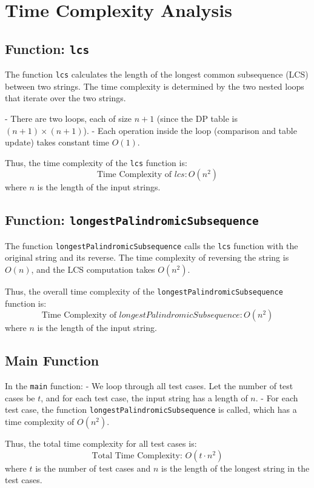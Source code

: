 \documentclass[a4paper,12pt]{report}
\begin{document}
\section*{Time Complexity Analysis}

\subsection*{Function: \texttt{lcs}}

The function \texttt{lcs} calculates the length of the longest common subsequence (LCS) between two strings. The time complexity is determined by the two nested loops that iterate over the two strings.

- There are two loops, each of size \(n+1\) (since the DP table is \( (n+1) \times (n+1) \)).
- Each operation inside the loop (comparison and table update) takes constant time \(O(1)\).

Thus, the time complexity of the \texttt{lcs} function is:
\[
\text{Time Complexity of } lcs: O(n^2)
\]
where \(n\) is the length of the input strings.

\subsection*{Function: \texttt{longestPalindromicSubsequence}}

The function \texttt{longestPalindromicSubsequence} calls the \texttt{lcs} function with the original string and its reverse. The time complexity of reversing the string is \(O(n)\), and the LCS computation takes \(O(n^2)\).

Thus, the overall time complexity of the \texttt{longestPalindromicSubsequence} function is:
\[
\text{Time Complexity of } longestPalindromicSubsequence: O(n^2)
\]
where \(n\) is the length of the input string.

\subsection*{Main Function}

In the \texttt{main} function:
- We loop through all test cases. Let the number of test cases be \(t\), and for each test case, the input string has a length of \(n\).
- For each test case, the function \texttt{longestPalindromicSubsequence} is called, which has a time complexity of \(O(n^2)\).

Thus, the total time complexity for all test cases is:
\[
\text{Total Time Complexity: } O(t \cdot n^2)
\]
where \(t\) is the number of test cases and \(n\) is the length of the longest string in the test cases.
\end{document}

